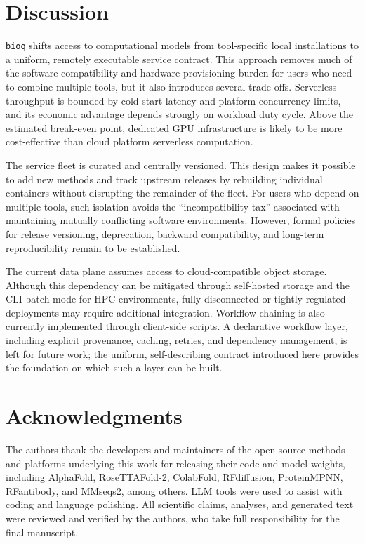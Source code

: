 \documentclass[webpdf,contemporary,large,namedate]{oup-authoring-template}%
\begin{document}
\section{Discussion}\label{sec:discussion}

\texttt{bioq} shifts access to computational models from tool-specific
local installations to a uniform, remotely executable service
contract. This approach removes much of the software-compatibility and
hardware-provisioning burden for users who need to combine multiple
tools, but it also introduces several trade-offs. Serverless
throughput is bounded by cold-start latency and platform concurrency
limits, and its economic advantage depends strongly on workload duty
cycle. Above the estimated break-even point, dedicated GPU
infrastructure is likely to be more cost-effective than cloud platform
serverless computation.

The service fleet is curated and centrally versioned. This design makes
it possible to add new methods and track upstream releases by rebuilding
individual containers without disrupting the remainder of the fleet.
For users who depend on multiple tools, such isolation avoids the
``incompatibility tax'' associated with maintaining mutually conflicting
software environments. However, formal policies for release versioning,
deprecation, backward compatibility, and long-term reproducibility
remain to be established.

The current data plane assumes access to cloud-compatible object
storage. Although this dependency can be mitigated through self-hosted
storage and the CLI batch mode for HPC environments, fully disconnected
or tightly regulated deployments may require additional integration.
Workflow chaining is also currently implemented through client-side
scripts. A declarative workflow layer, including explicit provenance,
caching, retries, and dependency management, is left for future work;
the uniform, self-describing contract introduced here provides the
foundation on which such a layer can be built.


\section*{Acknowledgments}\label{sec:acknowledgments}

The authors thank the developers and maintainers of the open-source
methods and platforms underlying this work for releasing their code
and model weights, including AlphaFold, RoseTTAFold-2, ColabFold,
RFdiffusion, ProteinMPNN, RFantibody, and MMseqs2, among others. LLM
tools were used to assist with coding and language polishing. All
scientific claims, analyses, and generated text were reviewed and
verified by the authors, who take full responsibility for the final
manuscript.
\end{document}
